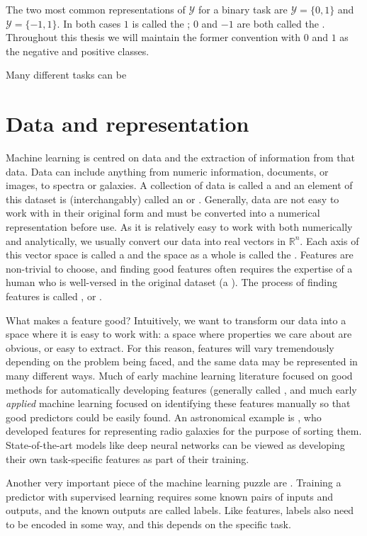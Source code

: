     The two most common representations of $\mathcal Y$ for a binary task are $\mathcal Y = \{0, 1\}$ and $\mathcal Y = \{-1, 1\}$. In both cases $1$ is called the ; $0$ and $-1$ are both called the . Throughout this thesis we will maintain the former convention with $0$ and $1$ as the negative and positive classes. 

    Many different tasks can be

\section{Data and representation}
\label{sec:data-and-representation}

    Machine learning is centred on data and the extraction of information from that data. Data can include anything from numeric information, documents, or images, to spectra or galaxies. A collection of data is called a  and an element of this dataset is (interchangably) called an  or . Generally, data are not easy to work with in their original form and must be converted into a numerical representation before use. As it is relatively easy to work with both numerically and analytically, we usually convert our data into real vectors in $\mathbb R^n$. Each axis of this vector space is called a  and the space as a whole is called the . Features are non-trivial to choose, and finding good features often requires the expertise of a human who is well-versed in the original dataset (a ). The process of finding features is called , or .

    What makes a feature good? Intuitively, we want to transform our data into a space where it is easy to work with: a space where properties we care about are obvious, or easy to extract. For this reason, features will vary tremendously depending on the problem being faced, and the same data may be represented in many different ways. Much of early machine learning literature focused on good methods for automatically developing features (generally called , and much early \emph{applied} machine learning focused on identifying these features manually so that good predictors could be easily found. An astronomical example is \citet{proctor06}, who developed features for representing radio galaxies for the purpose of sorting them. State-of-the-art models like deep neural networks \citep[e.g.][]{dieleman15cnn} can be viewed as developing their own task-specific features as part of their training.
    \label{sec:classification}

    Another very important piece of the machine learning puzzle are . Training a predictor with supervised learning requires some known pairs of inputs and outputs, and the known outputs are called labels. Like features, labels also need to be encoded in some way, and this depends on the specific task. \todo

